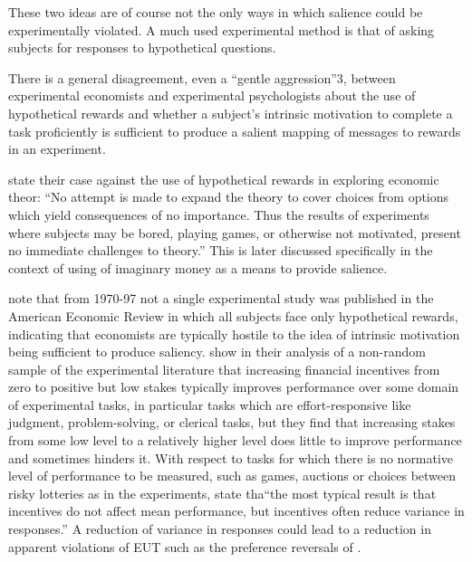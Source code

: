These two ideas are of course not the only ways in which salience could be experimentally violated.
A much used experimental method is that of asking subjects for responses to hypothetical questions.

There is a general disagreement, even a \enquote{gentle aggression}3, between experimental economists and experimental psychologists about the use of hypothetical rewards and whether a subject's intrinsic motivation to complete a task proficiently is sufficient to produce a salient mapping of messages to  rewards in an experiment.


\textcite[624]{Grether1979} state their case against the use of hypothetical rewards in exploring economic theor:
\enquote{No attempt is made to expand the theory to cover choices from options which yield consequences of no importance.\textelp{} Thus the results of experiments where subjects may be bored, playing games, or otherwise not motivated, present no immediate challenges to theory.} 
This is later discussed specifically in the context of using of imaginary money as a means to provide salience.

\textcite[31]{Camerer1999} note that from 1970-97 not a single experimental study was published in the American Economic Review in which all subjects face only hypothetical rewards, indicating that economists are typically hostile to the idea of intrinsic motivation being sufficient to produce saliency.
\textcite{Camerer1999} show in their analysis of a non-random sample of the experimental literature that increasing financial incentives from zero to positive but low stakes typically improves performance over some domain of experimental tasks, in particular tasks which are effort-responsive like judgment, problem-solving, or clerical tasks, but they find that increasing stakes from some low level to a relatively higher level does little to improve performance and sometimes hinders it.
With respect to tasks for which there is no normative level of performance to be measured, such as games, auctions or choices between risky lotteries as in the \textcite{Grether1979} experiments, \textcite[34]{Camerer1999} state tha\enquote{the most typical result is that incentives do not affect mean performance, but incentives often reduce variance in responses.}
A reduction of variance in responses could lead to a reduction in apparent violations of EUT such as the preference reversals of \textcite{Grether1979}.

